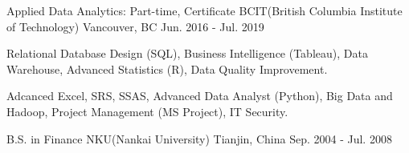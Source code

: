 

\begin{cventries}

  \cventry
    {Applied Data Analytics: Part-time, Certificate} %
    {BCIT(British Columbia Institute of Technology)} %
    {Vancouver, BC} %
    {Jun. 2016 - Jul. 2019} %
    {
      \begin{cvitems} %
        \item {Relational Database Design (SQL), Business Intelligence (Tableau), Data Warehouse, Advanced Statistics (R), Data Quality Improvement.}
        \item {Adcanced Excel, SRS, SSAS, Advanced Data Analyst (Python), Big Data and Hadoop, Project Management (MS Project), IT Security.}
      \end{cvitems}
    }

\end{cventries}


\begin{cventries}

  \cventry
    {B.S. in Finance} %
    {NKU(Nankai University)} %
    {Tianjin, China} %
    {Sep. 2004 - Jul. 2008} %
    {
      \begin{cvitems} %
      \end{cvitems}
    }

\end{cventries}
